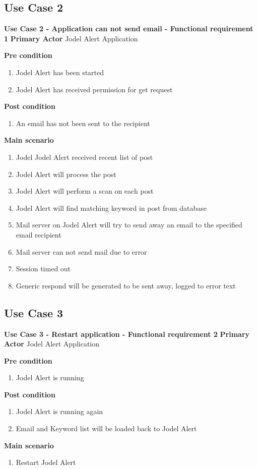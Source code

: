 \documentclass[a4paper,12pt]{article}
\begin{document}
\subsection{Use Case 2}
\textbf{Use Case 2 - Application can not send email - Functional requirement 1}
\textbf{Primary Actor}
Jodel Alert Application

\textbf{Pre condition}
\begin{enumerate}
	\item Jodel Alert has been started
	\item Jodel Alert has received permission for get request
\end{enumerate}
\textbf{Post condition}
\begin{enumerate}
	\item An email has not been sent to the recipient
\end{enumerate}
\textbf{Main scenario}
\begin{enumerate}
	\item Jodel Jodel Alert received recent list of post
	\item Jodel Alert will process the post
	\item Jodel Alert will perform a scan on each post
	\item Jodel Alert will find matching keyword in post from database 
	\item Mail server on Jodel Alert will try to send away an email to the specified email recipient
	\item Mail server can not send mail due to error
	\item Session timed out
	\item Generic respond will be generated to be sent away, logged to error text
\end{enumerate}
\subsection{Use Case 3}
\textbf{Use Case 3 - Restart application - Functional requirement 2}
\textbf{Primary Actor}
Jodel Alert Application

\textbf{Pre condition}
\begin{enumerate}
	\item Jodel Alert is running
\end{enumerate}
\textbf{Post condition}
\begin{enumerate}
	\item Jodel Alert is running again
	\item Email and Keyword list will be loaded back to Jodel Alert
\end{enumerate}
\textbf{Main scenario}
\begin{enumerate}
	\item Restart Jodel Alert
\end{enumerate}
\end{document}

